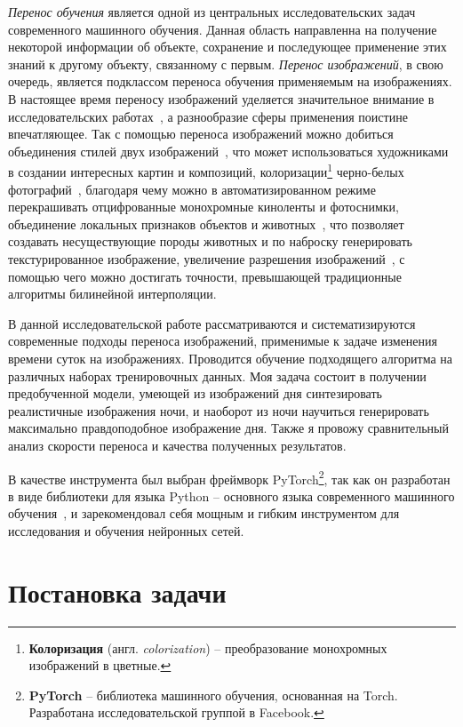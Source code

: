 \documentclass[11pt,a4paper]{extarticle}
\begin{document}
	\textit{Перенос обучения} является одной из центральных исследовательских задач современного машинного обучения.
	Данная область направленна на получение некоторой информации об объекте, сохранение и последующее применение этих знаний к другому объекту, связанному с первым.   
	\textit{Перенос изображений}, в свою очередь, является подклассом переноса обучения применяемым на изображениях. 
	В настоящее время переносу изображений уделяется значительное внимание в исследовательских работах~\cite{i2ipapers}, а разнообразие сферы применения поистине впечатляющее.
	Так с помощью переноса изображений можно добиться объединения стилей двух изображений~\cite{style_transfer}, что может использоваться художниками в создании интересных картин и композиций,
	колоризации\footnote{ \textbf{Колоризация} (англ. \textit{colorization}) -- преобразование монохромных изображений в цветные.} черно-белых фотографий~\cite{color_transfer},
	благодаря чему можно в автоматизированном режиме перекрашивать отцифрованные монохромные киноленты и фотоснимки,
	объединение локальных признаков объектов и животных~\cite{CycleGAN}, что позволяет создавать несуществующие породы животных и по наброску генерировать текстурированное изображение,
	увеличение разрешения изображений~\cite{super_resolution}, с помощью чего можно достигать точности, превышающей традиционные алгоритмы билинейной интерполяции.

	В данной исследовательской работе рассматриваются и систематизируются современные подходы переноса изображений, применимые к задаче изменения времени суток на изображениях.
	Проводится обучение подходящего алгоритма на различных наборах тренировочных данных.
	Моя задача состоит в получении предобученной модели, умеющей из изображений дня синтезировать реалистичные изображения ночи,
	и наоборот из ночи научиться генерировать максимально правдоподобное изображение дня. 
	Также я провожу сравнительный анализ скорости переноса и качества полученных результатов.
	
	В качестве инструмента был выбран фреймворк PyTorch\footnote{
		\textbf{PyTorch} -- библиотека машинного обучения, основанная на Torch. Разработана исследовательской группой в Facebook.
	}, так как он разработан в виде библиотеки для языка Python -- основного языка современного машинного обучения~\cite{ml_lang},
	и зарекомендовал себя мощным и гибким инструментом для исследования и обучения нейронных сетей.


\newpage
\section{Постановка задачи}
\end{document}
